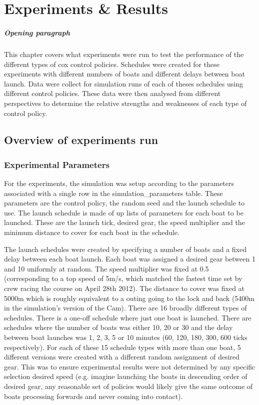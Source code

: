 \chapter{Experiments \& Results}
\paragraph{Opening paragraph}
This chapter covers what experiments were run to test the performance of the different types of cox control policies. Schedules were created for these experiments with different numbers of boats and different delays between boat launch. Data were collect for simulation runs of each of theses schedules using different control policies. These data were then analysed from different perspectives to determine the relative strengths and weaknesses of each type of control policy.

\section{Overview of experiments run}
  
  \subsection{Experimental Parameters}
  For the experiments, the simulation was setup according to the parameters associated with a single row in the simulation\_parameters table. These parameters are the control policy, the random seed and the launch schedule to use. The launch schedule is made of up lists of parameters for each boat to be launched. These are the launch tick, desired gear, the speed multiplier and the minimum distance to cover for each boat in the schedule.
  
  The launch schedules were created by specifying a number of boats and a fixed delay between each boat launch. Each boat was assigned a desired gear between 1 and 10 uniformly at random. The speed multiplier was fixed at 0.5 (corresponding to a top speed of 5m/s, which matched the fastest time set by crew racing the course on April 28th 2012). The distance to cover was fixed at 5000m which is roughly equivalent to a outing going to the lock and back (5400m in the simulation's version of the Cam). There are 16 broadly different types of schedules. There is a one-off schedule where just one boat is launched. There are schedules where the number of boats was either 10, 20 or 30 and the delay between boat launches was 1, 2, 3, 5 or 10 minutes (60, 120, 180, 300, 600 ticks respectively).  For each of these 15 schedule types with more than one boat, 5 different versions were created with a different random assignment of desired gear. This was to ensure experimental results were not determined by any specific selection desired speed (e.g. imagine launching the boats in descending order of desired gear, any reasonable set of policies would likely give the same outcome of boats processing forwards and never coming into contact).
  
